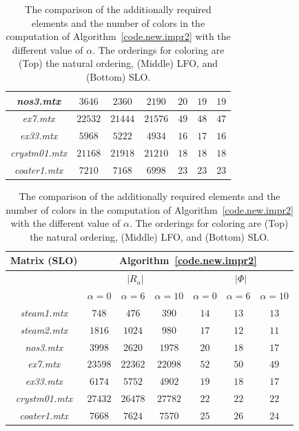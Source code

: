 \documentclass[12pt, twoside,a4paper,toc=bibliography]{scrbook}
\newcommand{\coderef}[1]{Algorithm~\protect\ref{#1}}
\begin{document}
\begin{table}
\begin{tabular}{|c|c|c|c|c|c|c|}
\textit{nos3.mtx} & $3646$ & $2360$ & $2190$ & $20$ & $19$ & $19$ \\\hline
\textit{ex7.mtx} & $22532$ & $21444$ & $21576$ & $49$ & $48$ & $47$ \\\hline
\textit{ex33.mtx} & $5968$ & $5222$ & $4934$ & $16$ & $17$ & $16$ \\\hline
\textit{crystm01.mtx} & $21168$ & $21918$ & $21210$ & $18$ & $18$ & $18$ \\\hline
\textit{coater1.mtx} & $7210$ & $7168$ & $6998$ & $23$ & $23$ & $23$ \\\hline
\end{tabular}
\vspace*{1cm}\newline
\begin{tabular}{|c|c|c|c|c|c|c|}
\hline
Matrix (SLO) & \multicolumn{6}{c|}{\coderef{code.new.impr2}} \\\hline
{} & \multicolumn{3}{c|}{$|R_{a}|$} & \multicolumn{3}{c|}{$|\Phi|$}\\\hline
{} & $\alpha=0$ & $\alpha=6$ & $\alpha=10$ & $\alpha=0$& $\alpha=6$&$\alpha=10$ \\\hline
\textit{steam1.mtx} & $748$ & $476$ & $390$ & $14$ & $13$ & $13$ \\\hline
\textit{steam2.mtx} & $1816$ & $1024$ & $980$ & $17$ & $12$ & $11$ \\\hline
\textit{nos3.mtx} & $3998$ & $2620$ & $1978$ & $20$ & $18$ & $17$ \\\hline
\textit{ex7.mtx} & $23598$ & $22362$ & $22098$ & $52$ & $50$ & $49$ \\\hline
\textit{ex33.mtx} & $6174$ & $5752$ & $4902$ & $19$ & $18$ & $17$ \\\hline
\textit{crystm01.mtx} & $27432$ & $26478$ & $27782$ & $22$ & $22$ & $22$ \\\hline
\textit{coater1.mtx} & $7668$ & $7624$ & $7570$ & $25$ & $26$ & $24$ \\\hline
\end{tabular}
\caption{The comparison of the additionally required elements and the number of colors 
in the computation of \coderef{code.new.impr2} with the different value of $\alpha$.
The orderings for coloring are (Top) the natural ordering,
(Middle) LFO, and (Bottom) SLO.}
\label{different.alpha}
\end{table}

\clearpage
\end{document}
